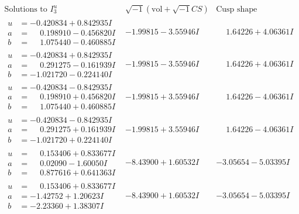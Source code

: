 \documentclass[1p]{elsarticle_modified}
\theoremstyle{definition}
\newcommand{\I}{\sqrt{-1}}
\begin{document}
$$\begin{array}{c|c|c}  
\text{Solutions to }I^u_{3}& \I (\text{vol} + \sqrt{-1}CS) & \text{Cusp shape}\\
 \hline 
\begin{aligned}
u &= -0.420834 + 0.842935 I \\
a &= \phantom{-}0.198910 - 0.456820 I \\
b &= \phantom{-}1.075440 - 0.460885 I\end{aligned}
 & -1.99815 - 3.55946 I & \phantom{-}1.64226 + 4.06361 I \\ \hline\begin{aligned}
u &= -0.420834 + 0.842935 I \\
a &= \phantom{-}0.291275 - 0.161939 I \\
b &= -1.021720 - 0.224140 I\end{aligned}
 & -1.99815 - 3.55946 I & \phantom{-}1.64226 + 4.06361 I \\ \hline\begin{aligned}
u &= -0.420834 - 0.842935 I \\
a &= \phantom{-}0.198910 + 0.456820 I \\
b &= \phantom{-}1.075440 + 0.460885 I\end{aligned}
 & -1.99815 + 3.55946 I & \phantom{-}1.64226 - 4.06361 I \\ \hline\begin{aligned}
u &= -0.420834 - 0.842935 I \\
a &= \phantom{-}0.291275 + 0.161939 I \\
b &= -1.021720 + 0.224140 I\end{aligned}
 & -1.99815 + 3.55946 I & \phantom{-}1.64226 - 4.06361 I \\ \hline\begin{aligned}
u &= \phantom{-}0.153406 + 0.833677 I \\
a &= \phantom{-}0.02090 - 1.60050 I \\
b &= \phantom{-}0.877616 + 0.641363 I\end{aligned}
 & -8.43900 + 1.60532 I & -3.05654 - 5.03395 I \\ \hline\begin{aligned}
u &= \phantom{-}0.153406 + 0.833677 I \\
a &= -1.42752 + 1.20623 I \\
b &= -2.23360 + 1.38307 I\end{aligned}
 & -8.43900 + 1.60532 I & -3.05654 - 5.03395 I \\ \hline\begin{aligned}

\end{aligned}
\end{array}$$
\end{document}
